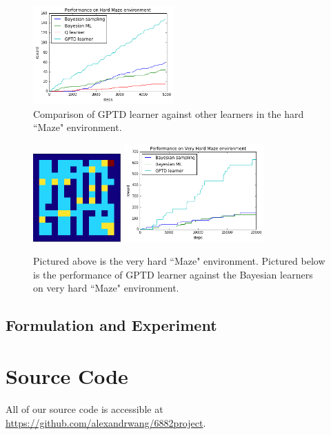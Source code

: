 \documentclass[10pt, twocolumn, twoside]{article}
\begin{document}
\begin{figure}[!htb]
\centering
\includegraphics[width=0.48\textwidth]{gptdCompare}
\caption{\label{fig:easyhardPerf} Comparison of GPTD learner against other learners in the hard ``Maze" environment.}
\end{figure}
\begin{figure}[!htb]
\centering
\includegraphics[width=0.30\textwidth]{veryhardmaze}
\includegraphics[width=0.48\textwidth]{veryHardMazePerf}
\caption{\label{fig:easyhardPerf} Pictured above is the very hard ``Maze" environment. Pictured below is the performance of GPTD learner against the Bayesian learners on very hard ``Maze" environment.}
\end{figure}

\subsection{Formulation and Experiment}

\section{Source Code}
All of our source code is accessible at \url{https://github.com/alexandrwang/6882project}.



\end{document}
